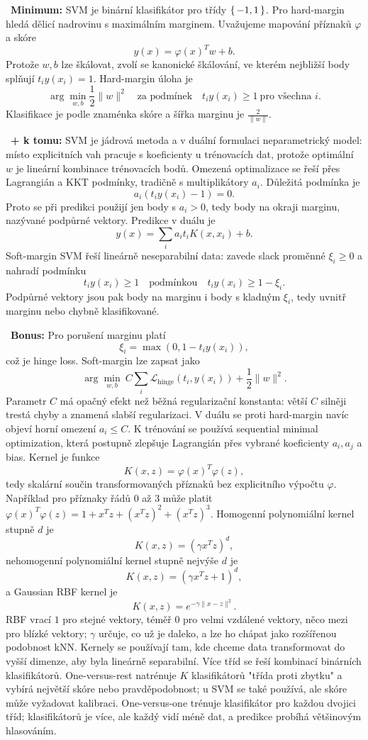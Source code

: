 \begin{odpoved}
\setlength{\parskip}{2pt}
\noindent{}\ \textbf{Minimum:} SVM je binární klasifikátor pro třídy $\{\,-1,1\,\}$. Pro hard-margin hledá dělicí nadrovinu s maximálním marginem. Uvažujeme mapování příznaků $\varphi$ a skóre
\[
y(x)=\varphi(x)^Tw+b.
\]
Protože $w,b$ lze škálovat, zvolí se kanonické škálování, ve kterém nejbližší body splňují $t_iy(x_i)=1$. Hard-margin úloha je
\[
\arg\min_{w,b}\frac12\|w\|^2
\quad\text{za podmínek}\quad
t_iy(x_i)\ge 1\ \text{pro všechna }i.
\]
Klasifikace je podle znaménka skóre a šířka marginu je $\frac{2}{\|w\|}$.\par
\noindent{}\ \textbf{+ k tomu:} SVM je jádrová metoda a v duální formulaci neparametrický model: místo explicitních vah pracuje s koeficienty u trénovacích dat, protože optimální $w$ je lineární kombinace trénovacích bodů. Omezená optimalizace se řeší přes Lagrangián a KKT podmínky, tradičně s multiplikátory $a_i$. Důležitá podmínka je
\[
a_i(t_iy(x_i)-1)=0.
\]
Proto se při predikci použijí jen body s $a_i>0$, tedy body na okraji marginu, nazývané podpůrné vektory. Predikce v duálu je
\[
y(x)=\sum_i a_it_iK(x,x_i)+b.
\]
Soft-margin SVM řeší lineárně neseparabilní data: zavede slack proměnné $\xi_i\ge 0$ a nahradí podmínku
\[
t_iy(x_i)\ge 1
\quad\text{podmínkou}\quad
t_iy(x_i)\ge 1-\xi_i.
\]
Podpůrné vektory jsou pak body na marginu i body s kladným $\xi_i$, tedy uvnitř marginu nebo chybně klasifikované.\par
\noindent{}\ \textbf{Bonus:} Pro porušení marginu platí
\[
\xi_i=\max(0,1-t_iy(x_i)),
\]
což je hinge loss. Soft-margin lze zapsat jako
\[
\arg\min_{w,b}\ C\sum_i\mathcal L_{\mathrm{hinge}}(t_i,y(x_i))
+\frac12\|w\|^2.
\]
Parametr $C$ má opačný efekt než běžná regularizační konstanta: větší $C$ silněji trestá chyby a znamená slabší regularizaci. V duálu se proti hard-margin navíc objeví horní omezení $a_i\le C$. K trénování se používá sequential minimal optimization, která postupně zlepšuje Lagrangián přes vybrané koeficienty $a_i,a_j$ a bias.
Kernel je funkce
\[
K(x,z)=\varphi(x)^T\varphi(z),
\]
tedy skalární součin transformovaných příznaků bez explicitního výpočtu $\varphi$. Například pro příznaky řádů $0$ až $3$ může platit $\varphi(x)^T\varphi(z)=1+x^Tz+(x^Tz)^2+(x^Tz)^3$. Homogenní polynomiální kernel stupně $d$ je
\[
K(x,z)=(\gamma x^Tz)^d,
\]
nehomogenní polynomiální kernel stupně nejvýše $d$ je
\[
K(x,z)=(\gamma x^Tz+1)^d,
\]
a Gaussian RBF kernel je
\[
K(x,z)=e^{-\gamma\|x-z\|^2}.
\]
RBF vrací $1$ pro stejné vektory, téměř $0$ pro velmi vzdálené vektory, něco mezi pro blízké vektory; $\gamma$ určuje, co už je daleko, a lze ho chápat jako rozšířenou podobnost kNN. Kernely se používají tam, kde chceme data transformovat do vyšší dimenze, aby byla lineárně separabilní.
Více tříd se řeší kombinací binárních klasifikátorů. One-versus-rest natrénuje $K$ klasifikátorů "třída proti zbytku" a vybírá největší skóre nebo pravděpodobnost; u SVM se také používá, ale skóre může vyžadovat kalibraci. One-versus-one trénuje klasifikátor pro každou dvojici tříd; klasifikátorů je více, ale každý vidí méně dat, a predikce probíhá většinovým hlasováním.
\end{odpoved}
